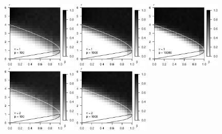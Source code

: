\begin{figure}
      \centering
      \includegraphics[width=0.32\textwidth]{sim_strong_boundary/simulated_phase_diagram_chi-squared_nu1_p100.eps}
      \includegraphics[width=0.32\textwidth]{sim_strong_boundary/simulated_phase_diagram_chi-squared_nu1_p1000.eps}
      \includegraphics[width=0.32\textwidth]{sim_strong_boundary/simulated_phase_diagram_chi-squared_nu1_p10000.eps}
      \includegraphics[width=0.32\textwidth]{sim_strong_boundary/simulated_phase_diagram_chi-squared_nu2_p100.eps}
      \includegraphics[width=0.32\textwidth]{sim_strong_boundary/simulated_phase_diagram_chi-squared_nu2_p1000.eps}

\end{figure}

